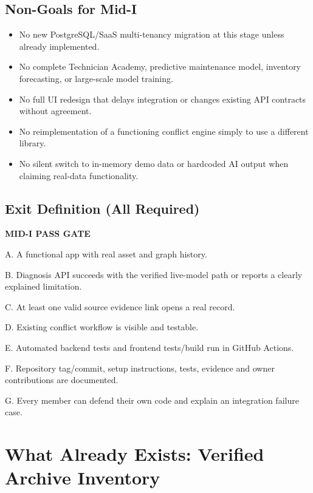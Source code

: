 \documentclass[11pt,a4paper,oneside]{report}
\begin{document}
\section{Non-Goals for Mid-I}
\begin{itemize}
\item No new PostgreSQL/SaaS multi-tenancy migration at this stage unless already implemented.
\item No complete Technician Academy, predictive maintenance model, inventory forecasting, or large-scale model training.
\item No full UI redesign that delays integration or changes existing API contracts without agreement.
\item No reimplementation of a functioning conflict engine simply to use a different library.
\item No silent switch to in-memory demo data or hardcoded AI output when claiming real-data functionality.
\end{itemize}

\section{Exit Definition (All Required)}
\begin{notice}
\textbf{MID-I PASS GATE}\par
A. A functional app with real asset and graph history.\par
B. Diagnosis API succeeds with the verified live-model path or reports a clearly explained limitation.\par
C. At least one valid source evidence link opens a real record.\par
D. Existing conflict workflow is visible and testable.\par
E. Automated backend tests and frontend tests/build run in GitHub Actions.\par
F. Repository tag/commit, setup instructions, tests, evidence and owner contributions are documented.\par
G. Every member can defend their own code and explain an integration failure case.
\end{notice}

\chapter{What Already Exists: Verified Archive Inventory}
\end{document}
